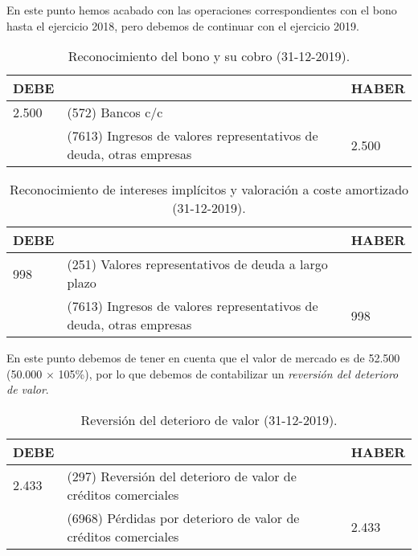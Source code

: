 En este punto hemos acabado con las operaciones correspondientes con el bono hasta el ejercicio 2018, pero debemos de continuar con el ejercicio 2019.

\begin{table}[H]
    \centering
    \begin{tabular}{|p{2cm}|p{6cm}|p{2cm}|}
    \hline
    \rowcolor{blue!30}
    \textbf{DEBE} & \textbf{} & \textbf{HABER} \\
    \hline
    2.500 & (572) Bancos c/c & \\
    \hline
    & (7613) Ingresos de valores representativos de deuda, otras empresas \newline&2.500 \\
    \hline
    \end{tabular}
    \caption{Reconocimiento del bono y su cobro (31-12-2019).}
    \label{tabla:reconocimiento_bono}
\end{table}

\begin{table}[H]
    \centering
    \begin{tabular}{|p{2cm}|p{6cm}|p{2cm}|}
    \hline
    \rowcolor{blue!30}
    \textbf{DEBE} & \textbf{} & \textbf{HABER} \\
    \hline
    998 & (251) Valores representativos de deuda a largo plazo & \\
    \hline
    & (7613) Ingresos de valores representativos de deuda, otras empresas& 998 \\
    \hline
    \end{tabular}
    \caption{Reconocimiento de intereses implícitos y valoración a coste amortizado (31-12-2019).}
    \label{tabla:intereses_implicitos}
\end{table}

En este punto debemos de tener en cuenta que el valor de mercado es de 52.500 \e (50.000 $\times$ 105\%), por lo que debemos de contabilizar un \textit{reversión del deterioro de valor}.

\begin{table}[H]
    \centering
    \begin{tabular}{|p{2cm}|p{6cm}|p{2cm}|}
    \hline
    \rowcolor{blue!30}
    \textbf{DEBE} & \textbf{} & \textbf{HABER} \\
    \hline
    2.433 & (297) Reversión del deterioro de valor de créditos comerciales & \\
    \hline
    & (6968) Pérdidas por deterioro de valor de créditos comerciales & 2.433 \\
    \hline
    \end{tabular}
    \caption{Reversión del deterioro de valor (31-12-2019).}
    \label{tabla:reversion_deterioro}
\end{table}

